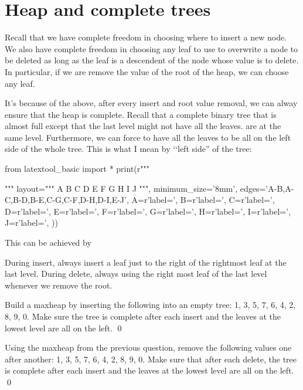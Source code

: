 \section{Heap and complete trees}

Recall that we have complete freedom in choosing where to insert a new node.
We also have complete freedom in choosing any leaf to use to overwrite
a node to be deleted as long as the leaf is a descendent of the node whose
value is to delete.
In particular, if we are remove the value of the root of the heap,
we can choose any leaf.

It's because of the above,
after every insert and root value removal,
we can alway ensure that the heap is complete.
Recall that a complete binary tree that is almost full except that the
last level might not have all the leaves.
are at the same level.
Furthermore, we can force to have
all the leaves to be all on the left side of the whole
tree.
This is what I mean by \lq\lq left side'' of the tree:

\begin{python}
from latextool_basic import *
print(r"""
\begin{center}
\end{center}
""" %
layout="""
      A 
   B     C
 D   E F   G
H I J
""",
minimum_size='8mm',
edges='A-B,A-C,B-D,B-E,C-G,C-F,D-H,D-I,E-J',
A=r'label=',
B=r'label=',
C=r'label=',
D=r'label=',
E=r'label=',
F=r'label=',
G=r'label=',
H=r'label=',
I=r'label=',
J=r'label=',
))
\end{python}

This can be achieved by
\begin{tightlist}
\li During insert, always insert a leaf just to the right of the
rightmost leaf at the last level.
\li During delete, always using the right most leaf of the 
last level whenever we remove the root.
\end{tightlist}




\newpage
\begin{ex}
Build a maxheap by inserting the following into an empty tree:
1, 3, 5, 7, 6, 4, 2, 8, 9, 0.
Make sure the tree is complete after each insert and the leaves
at the lowest level are all on the left.
\qed
\end{ex}

\newpage
\begin{ex}
Using the maxheap from the previous question,
remove the following values one after another:
1, 3, 5, 7, 6, 4, 2, 8, 9, 0.
Make sure that after each delete, the tree is complete after each insert and the leaves
at the lowest level are all on the left.
\qed
\end{ex}

